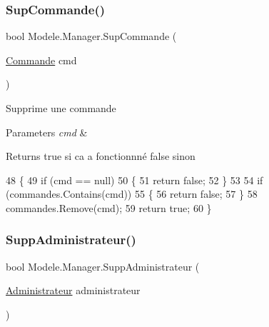 \subsubsection{\texorpdfstring{Sup\+Commande()}{SupCommande()}}
{\footnotesize\ttfamily bool Modele.\+Manager.\+Sup\+Commande (\begin{DoxyParamCaption}\item[{\hyperlink{classModele_1_1Commande}{Commande}}]{cmd }\end{DoxyParamCaption})\hspace{0.3cm}{\ttfamily [inline]}}



Supprime une commande 


\begin{DoxyParams}{Parameters}
{\em cmd} & \\
\hline
\end{DoxyParams}
\begin{DoxyReturn}{Returns}
true si ca a fonctionnné false sinon
\end{DoxyReturn}

\begin{DoxyCode}
48         \{
49             \textcolor{keywordflow}{if} (cmd == null)
50             \{
51                 \textcolor{keywordflow}{return} \textcolor{keyword}{false};
52             \}
53 
54             \textcolor{keywordflow}{if} (commandes.Contains(cmd))
55             \{
56                 \textcolor{keywordflow}{return} \textcolor{keyword}{false};
57             \}
58             commandes.Remove(cmd);
59             \textcolor{keywordflow}{return} \textcolor{keyword}{true};
60         \}
\end{DoxyCode}
\mbox{\label{classModele_1_1Manager_ac06a3ffe203cb1ae9b91928bdb54e63f}} 
\subsubsection{\texorpdfstring{Supp\+Administrateur()}{SuppAdministrateur()}}
{\footnotesize\ttfamily bool Modele.\+Manager.\+Supp\+Administrateur (\begin{DoxyParamCaption}\item[{\hyperlink{classModele_1_1Administrateur}{Administrateur}}]{administrateur }\end{DoxyParamCaption})\hspace{0.3cm}{\ttfamily [inline]}}



